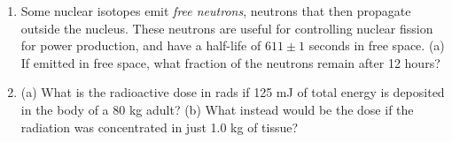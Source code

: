 \documentclass[12pt,twocolumn]{article}
\begin{document}
\begin{enumerate}
\item Some nuclear isotopes emit \textit{free neutrons}, neutrons that then propagate outside the nucleus.  These neutrons are useful for controlling nuclear fission for power production, and have a half-life of $611\pm 1$ seconds in free space.  (a) If emitted in free space, what fraction of the neutrons remain after 12 hours? \\ \vspace{1cm}
\item (a) What is the radioactive dose in rads if 125 mJ of total energy is deposited in the body of a 80 kg adult? (b) What instead would be the dose if the radiation was concentrated in just 1.0 kg of tissue? \\ \vspace{2cm}
\end{enumerate}
\end{document}
